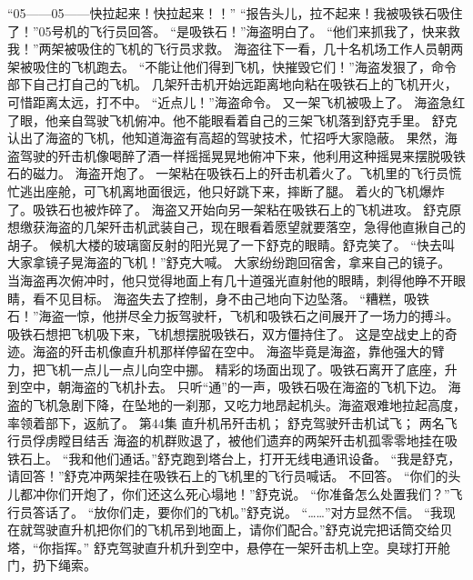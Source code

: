 \documentclass[a4paper,12pt,UTF8,twoside]{ctexbook}
\begin{document}
        “05——05——快拉起来！快拉起来！！” 
        “报告头儿，拉不起来！我被吸铁石吸住了！”05号机的飞行员回答。 
        “是吸铁石！”海盗明白了。 
        “他们来抓我了，快来救我！”两架被吸住的飞机的飞行员求救。 
        海盗往下一看，几十名机场工作人员朝两架被吸住的飞机跑去。 
        “不能让他们得到飞机，快摧毁它们！”海盗发狠了，命令部下自己打自己的飞机。 
        几架歼击机开始远距离地向粘在吸铁石上的飞机开火，可惜距离太远，打不中。 
        “近点儿！”海盗命令。 
        又一架飞机被吸上了。 
        海盗急红了眼，他亲自驾驶飞机俯冲。他不能眼看着自己的三架飞机落到舒克手里。 
        舒克认出了海盗的飞机，他知道海盗有高超的驾驶技术，忙招呼大家隐蔽。 
        果然，海盗驾驶的歼击机像喝醉了酒一样摇摇晃晃地俯冲下来，他利用这种摇晃来摆脱吸铁石的磁力。 
        海盗开炮了。 
        一架粘在吸铁石上的歼击机着火了。飞机里的飞行员慌忙逃出座舱，可飞机离地面很远，他只好跳下来，摔断了腿。 
        着火的飞机爆炸了。吸铁石也被炸碎了。 
        海盗又开始向另一架粘在吸铁石上的飞机进攻。 
        舒克原想缴获海盗的几架歼击机武装自己，现在眼看着愿望就要落空，急得他直揪自己的胡子。 
        候机大楼的玻璃窗反射的阳光晃了一下舒克的眼睛。舒克笑了。 
        “快去叫大家拿镜子晃海盗的飞机！”舒克大喊。 
        大家纷纷跑回宿舍，拿来自己的镜子。 
        当海盗再次俯冲时，他只觉得地面上有几十道强光直射他的眼睛，刺得他睁不开眼睛，看不见目标。 
        海盗失去了控制，身不由己地向下边坠落。 
        “糟糕，吸铁石！”海盗一惊，他拼尽全力扳驾驶杆，飞机和吸铁石之间展开了一场力的搏斗。 
        吸铁石想把飞机吸下来，飞机想摆脱吸铁石，双方僵持住了。 
        这是空战史上的奇迹。海盗的歼击机像直升机那样停留在空中。 
        海盗毕竟是海盗，靠他强大的臂力，把飞机一点儿一点儿向空中挪。 
        精彩的场面出现了。吸铁石离开了底座，升到空中，朝海盗的飞机扑去。 
        只听“通”的一声，吸铁石吸在海盗的飞机下边。 
        海盗的飞机急剧下降，在坠地的一刹那，又吃力地昂起机头。海盗艰难地拉起高度，率领着部下，返航了。   第44集 
        直升机吊歼击机； 
        舒克驾驶歼击机试飞； 
        两名飞行员俘虏瞠目结舌   
        海盗的机群败退了，被他们遗弃的两架歼击机孤零零地挂在吸铁石上。 
        “我和他们通话。”舒克跑到塔台上，打开无线电通讯设备。 
        “我是舒克，请回答！”舒克冲两架挂在吸铁石上的飞机里的飞行员喊话。 
        不回答。 
        “你们的头儿都冲你们开炮了，你们还这么死心塌地！”舒克说。 
        “你准备怎么处置我们？”飞行员答话了。 
        “放你们走，要你们的飞机。”舒克说。 
        “……”对方显然不信。 
        “我现在就驾驶直升机把你们的飞机吊到地面上，请你们配合。”舒克说完把话筒交给贝塔，“你指挥。” 
        舒克驾驶直升机升到空中，悬停在一架歼击机上空。臭球打开舱门，扔下绳索。 
\end{document}
